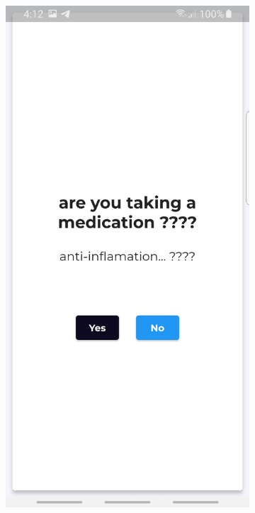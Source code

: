 \begin{figure}
\begin{subfigure}{.31\textwidth}
  \label{fig:sub-third}
\end{subfigure}
\newline
\begin{subfigure}{.31\textwidth}
  \centering
  \includegraphics[width=1\linewidth]{images1/quess4.jpg}  

\end{subfigure}
\end{figure}
